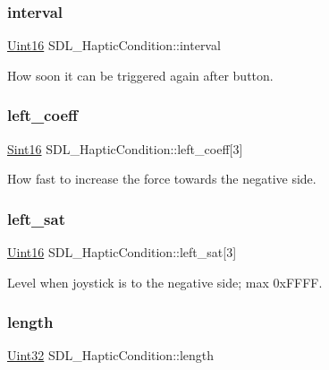 \subsubsection{\texorpdfstring{interval}{interval}}
{\footnotesize\ttfamily \mbox{\hyperlink{_s_d_l__stdinc_8h_a31fcc0a076c9068668173ee26d33e42b}{Uint16}} S\+D\+L\+\_\+\+Haptic\+Condition\+::interval}

How soon it can be triggered again after button. \mbox{\label{struct_s_d_l___haptic_condition_a2adf52c32f60f0b6826b1e3add2eae7a}} 
\subsubsection{\texorpdfstring{left\_coeff}{left\_coeff}}
{\footnotesize\ttfamily \mbox{\hyperlink{_s_d_l__stdinc_8h_a9d0257032c0e146ab6121bf0122712f5}{Sint16}} S\+D\+L\+\_\+\+Haptic\+Condition\+::left\+\_\+coeff\mbox{[}3\mbox{]}}

How fast to increase the force towards the negative side. \mbox{\label{struct_s_d_l___haptic_condition_a953448774c40818a4f47c6efea21124d}} 
\subsubsection{\texorpdfstring{left\_sat}{left\_sat}}
{\footnotesize\ttfamily \mbox{\hyperlink{_s_d_l__stdinc_8h_a31fcc0a076c9068668173ee26d33e42b}{Uint16}} S\+D\+L\+\_\+\+Haptic\+Condition\+::left\+\_\+sat\mbox{[}3\mbox{]}}

Level when joystick is to the negative side; max 0x\+F\+F\+FF. \mbox{\label{struct_s_d_l___haptic_condition_ad0efb0a6ddc20f058e87199eaaa95978}} 
\subsubsection{\texorpdfstring{length}{length}}
{\footnotesize\ttfamily \mbox{\hyperlink{_s_d_l__stdinc_8h_add440eff171ea5f55cb00c4a9ab8672d}{Uint32}} S\+D\+L\+\_\+\+Haptic\+Condition\+::length}

